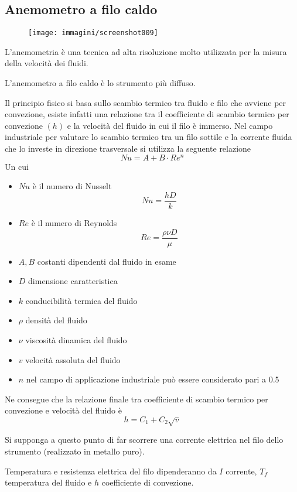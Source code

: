 \documentclass[a4paper, 15pt]{article}
\begin{document}
\subsection{Anemometro a filo caldo}
\begin{adjustwidth}{2in}{}	
	\begin{figure}[H]
		\centering
		\texttt{[image: immagini/screenshot009]}
		\label{fig:screenshot009}
	\end{figure}
	
	L’anemometria è una tecnica ad alta risoluzione molto utilizzata per la misura della velocità dei fluidi.
	
	L’anemometro a filo caldo è lo strumento più diffuso. \newline
	
	Il principio fisico si basa sullo scambio termico tra fluido e filo che avviene per convezione, esiste infatti una relazione  tra il coefficiente di scambio termico per convezione $(h)$ e la velocità del fluido in cui il filo è
	immerso. 
\newpage
	Nel campo industriale per valutare lo scambio termico tra un filo sottile
	e la corrente fluida che lo investe in direzione trasversale si utilizza la
	seguente relazione
	\[Nu = A + B \cdot Re^n\]
	Un cui 
	\begin{itemize}
		\item $Nu$ è il numero di Nusselt
		\[Nu = \dfrac{hD}{k}\]
		\item $Re$ è il numero di Reynolds
		\[Re = \dfrac{\rho\nu D}{\mu}\]
		\item $A,B$ costanti dipendenti dal fluido in esame
		\item $D$ dimensione caratteristica
		\item $k$ conducibilità termica del fluido
		\item $\rho$ densità del fluido
		\item $\nu$ viscosità dinamica del fluido
		\item $v$ velocità assoluta del fluido
		\item $n$ nel campo di applicazione industriale può essere considerato pari a
		0.5
	\end{itemize}
	Ne consegue che la relazione finale tra coefficiente di scambio
	termico per convezione e velocità del fluido è
	\[h = C_1 + C_2\sqrt{v}\]
	
	Si supponga a questo punto di far scorrere una corrente elettrica nel filo dello strumento (realizzato in metallo puro). 
	
	Temperatura e resistenza elettrica del filo dipenderanno da $I$ corrente, $T_f$ temperatura del fluido e $h$ coefficiente di convezione. 
	

\end{adjustwidth}
\end{document}
